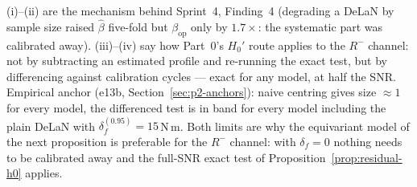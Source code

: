 (i)--(ii) are the mechanism behind Sprint~4, Finding~4 (degrading a DeLaN
by sample size raised $\hat\beta$ five-fold but $\beta_{\mathrm{op}}$ only by
$1.7\times$: the systematic part was calibrated away). (iii)--(iv) say how
Part~0's $H_0'$ route applies to the $R^{-}$ channel: not by subtracting an
estimated profile and re-running the exact test, but by differencing against
calibration cycles --- exact for any model, at half the SNR. Empirical anchor
(e13b, Section~\ref{sec:p2-anchors}): naive centring gives size $\approx 1$
for every model, the differenced test is in band for every model including
the plain DeLaN with $\delta_f^{(0.95)} = 15$\,N\,m. Both limits are why the
equivariant model of the next proposition is preferable for the $R^{-}$
channel: with $\delta_f = 0$ nothing needs to be calibrated away and the
full-SNR exact test of Proposition~\ref{prop:residual-h0} applies.

